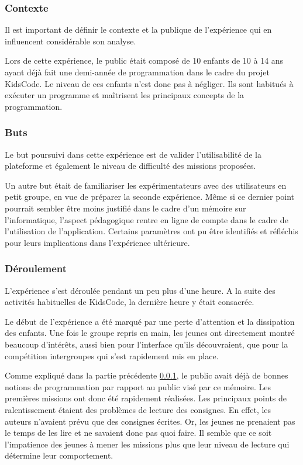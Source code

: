\subsubsection{Contexte}
\label{context-kidscode}
Il est important de définir le contexte et la publique de l'expérience qui en influencent considérable son analyse.

Lors de cette expérience, le public était composé de 10 enfants de 10 à 14 ans ayant déjà fait une demi-année de programmation dans le cadre du projet KidsCode. Le niveau de ces enfants n'est donc pas à négliger. Ils sont habitués à exécuter un programme et maîtrisent les principaux concepts de la programmation.

\subsubsection{Buts}
Le but poursuivi dans cette expérience est de valider l'utilisabilité de la plateforme et également le niveau de difficulté des \glspl{mission} proposées.

Un autre but était de familiariser les expérimentateurs avec des utilisateurs en petit groupe, en vue de préparer la seconde expérience.
Même si ce dernier point pourrait sembler être moins justifié dans le cadre d'un mémoire sur l'informatique, l'aspect pédagogique rentre en ligne de compte dans le cadre de l'utilisation de l'application. Certains paramètres ont pu être identifiés et réfléchis pour leurs implications dans l'expérience ultérieure.

\subsubsection{Déroulement}
L'expérience s'est déroulée pendant un peu plus d'une heure. A la suite des activités habituelles de KidsCode, la dernière heure y était consacrée.

Le début de l'expérience a été marqué par une perte d'attention et la dissipation des enfants. Une fois le groupe repris en main, les jeunes ont directement montré beaucoup d'intérêts, aussi bien pour l'interface qu'ils découvraient, que pour la compétition intergroupes qui s'est rapidement mis en place.

Comme expliqué dans la partie précédente \ref{context-kidscode}, le public avait déjà de bonnes notions de programmation par rapport au public visé par ce mémoire. Les premières \glspl{mission} ont donc été rapidement réalisées. Les principaux points de ralentissement étaient des problèmes de lecture des consignes. En effet, les auteurs n'avaient prévu que des consignes écrites. Or, les jeunes ne prenaient pas le temps de les lire et ne savaient donc pas quoi faire. Il semble que ce soit l'impatience des jeunes à mener les \glspl{mission} plus que leur niveau de lecture qui détermine leur comportement.

